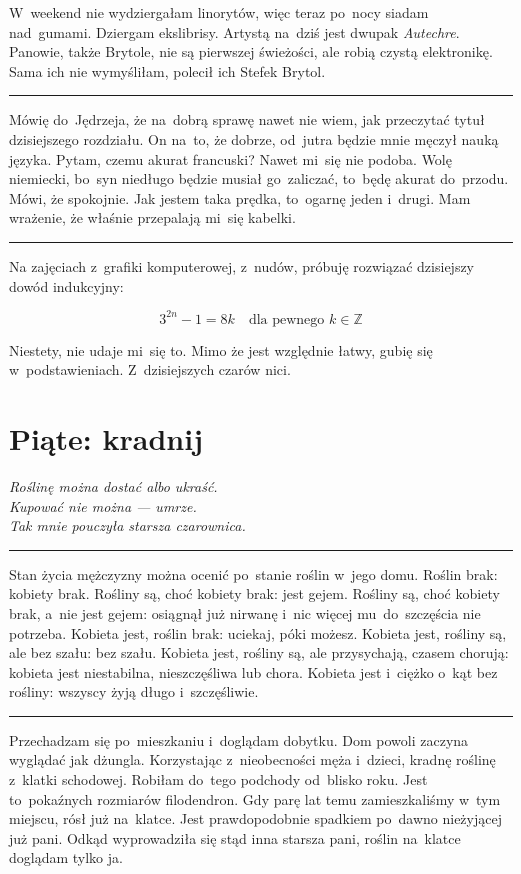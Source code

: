 \documentclass[9pt, a5paper]{memoir}
\begin{document}
W~weekend nie wydziergałam linorytów, więc teraz po~nocy siadam nad~gumami. Dziergam ekslibrisy. Artystą na~dziś jest dwupak \textit{Autechre}. Panowie, także Brytole, nie są pierwszej świeżości, ale robią czystą elektronikę. Sama ich nie wymyśliłam, polecił ich Stefek Brytol.

\fancybreak{* \quad * \quad *}

Mówię do~Jędrzeja, że na~dobrą sprawę nawet nie wiem, jak przeczytać tytuł dzisiejszego rozdziału. On na~to, że dobrze, od~jutra będzie mnie męczył nauką języka. Pytam, czemu akurat francuski? Nawet mi~się nie podoba. Wolę niemiecki, bo~syn niedługo będzie musiał go~zaliczać, to~będę akurat do~przodu. Mówi, że spokojnie. Jak jestem taka prędka, to~ogarnę jeden i~drugi. Mam wrażenie, że właśnie przepalają mi~się kabelki.

\fancybreak{* \quad * \quad *}

Na zajęciach z~grafiki komputerowej, z~nudów, próbuję rozwiązać dzisiejszy dowód indukcyjny:

$$3^{2n}-1 = 8k \quad \text{dla pewnego } k \in \mathbb{Z}$$

Niestety, nie udaje mi~się to. Mimo że jest względnie łatwy, gubię się w~podstawieniach. Z~dzisiejszych czarów nici.

\newpage
\section{Piąte: kradnij}
{
\itshape
Roślinę można dostać albo ukraść.\\
Kupować nie można --- umrze.\\
Tak mnie pouczyła starsza czarownica.
}

\fancybreak{* \quad * \quad *}

Stan życia mężczyzny można ocenić po~stanie roślin w~jego domu. Roślin brak: kobiety brak. Rośliny są, choć kobiety brak: jest gejem. Rośliny są, choć kobiety brak, a~nie jest gejem: osiągnął już nirwanę i~nic więcej mu~do~szczęścia nie potrzeba. Kobieta jest, roślin brak: uciekaj, póki możesz. Kobieta jest, rośliny są, ale bez szału: bez szału. Kobieta jest, rośliny są, ale przysychają, czasem chorują: kobieta jest niestabilna, nieszczęśliwa lub chora. Kobieta jest i~ciężko o~kąt bez rośliny: wszyscy żyją długo i~szczęśliwie.

\fancybreak{* \quad * \quad *}

Przechadzam się po~mieszkaniu i~doglądam dobytku. Dom powoli zaczyna wyglądać jak dżungla. Korzystając z~nieobecności męża i~dzieci, kradnę roślinę z~klatki schodowej. Robiłam do~tego podchody od~blisko roku. Jest to~pokaźnych rozmiarów filodendron. Gdy parę lat temu zamieszkaliśmy w~tym miejscu, rósł już na~klatce. Jest prawdopodobnie spadkiem po~dawno nieżyjącej już pani. Odkąd wyprowadziła się stąd inna starsza pani, roślin na~klatce doglądam tylko ja.
\end{document}
